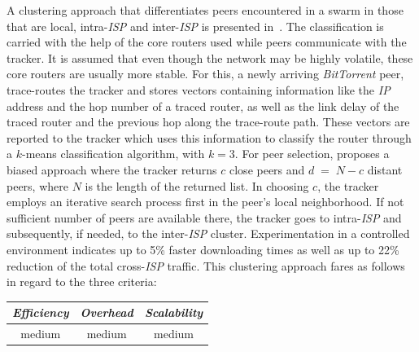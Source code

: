 A clustering approach that differentiates peers encountered in a swarm
in those that are local, intra-\emph{ISP} and inter-\emph{ISP} is 
presented in~\cite{QLZG2009}.
The classification is carried with the help of the core routers used 
while peers communicate with the tracker. It is assumed that even though the
network may be highly volatile, these core routers are usually more stable.
For this, a newly arriving
{\sl BitTorrent} peer, trace-routes the tracker and stores vectors containing
information like the \emph{IP} address and the hop number of a traced router, as well as the
link delay of the traced router and the previous hop along the trace-route path.
These vectors are reported to the tracker which uses
this information
to classify the router through a $k$-means classification algorithm, with $k = 3$. 
For peer selection, \cite{QLZG2009} proposes a biased approach 
where the tracker returns $c$ close peers 
and $d\;=\;N-c$ distant peers, where $N$ is the length of the returned list. 
In choosing $c$, the tracker employs an iterative search process
first in the peer's local neighborhood. If not sufficient number of 
peers are available there, the tracker goes to intra-\emph{ISP} 
and subsequently, if needed, to the inter-\emph{ISP} cluster. 
Experimentation in a controlled environment indicates up to
5\% faster downloading times as well as up to 22\% reduction of 
the total cross-\emph{ISP} traffic.
This clustering approach fares as follows in regard 
to the three criteria:
\begin{center}
{\footnotesize
\begin{tabular}{ccc}
\emph{Efficiency} & \emph{Overhead} & \emph{Scalability} \\
\hline
medium &
medium &
medium
\end{tabular}
}
\end{center}

